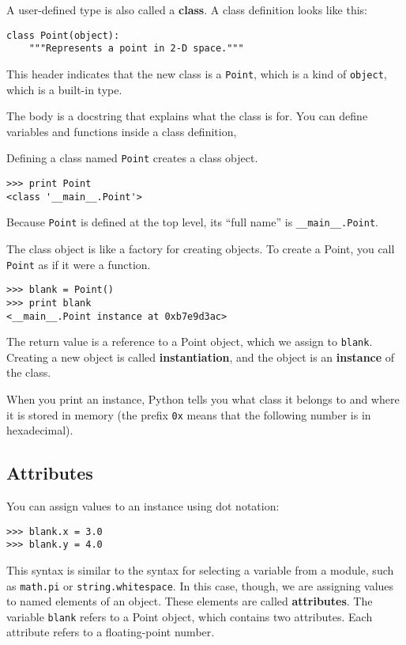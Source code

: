 \documentclass{article}
\begin{document}
A user-defined type is also called a {\bf class}.
A class definition looks like this:

\begin{verbatim}
class Point(object):
    """Represents a point in 2-D space."""
\end{verbatim}

This header indicates that the new class is a \verb|Point|, which is a
kind of \verb|object|, which is a built-in type.

The body is a docstring that explains what the class is for.
You can define variables and functions inside a class definition,

Defining a class named \verb|Point| creates a class object.
\begin{verbatim}
>>> print Point
<class '__main__.Point'>
\end{verbatim}
Because \verb|Point| is defined at the top level, its ``full name'' is
\verb|__main__.Point|.

The class object is like a factory for creating objects. To create a
Point, you call \verb|Point| as if it were a function.
\begin{verbatim}
>>> blank = Point()
>>> print blank
<__main__.Point instance at 0xb7e9d3ac>
\end{verbatim}
The return value is a reference to a Point object, which we assign to
\verb|blank|. Creating a new object is called {\bf instantiation},
and the object is an
{\bf instance} of the class.

When you print an instance, Python tells you what
class it belongs to and where it is stored in memory (the prefix
\verb|0x| means that the following number is in hexadecimal).

\subsection{Attributes}
You can assign values to an instance using dot notation:
\begin{verbatim}
>>> blank.x = 3.0
>>> blank.y = 4.0
\end{verbatim}
This syntax is similar to the syntax for selecting a variable from a
module, such as \verb|math.pi| or \verb|string.whitespace|.
In this case, though, we are assigning values to named elements of
an object. These elements are called {\bf attributes}.
The variable \verb|blank| refers to a Point object, which contains
two attributes. Each attribute refers to a floating-point number.
\end{document}

